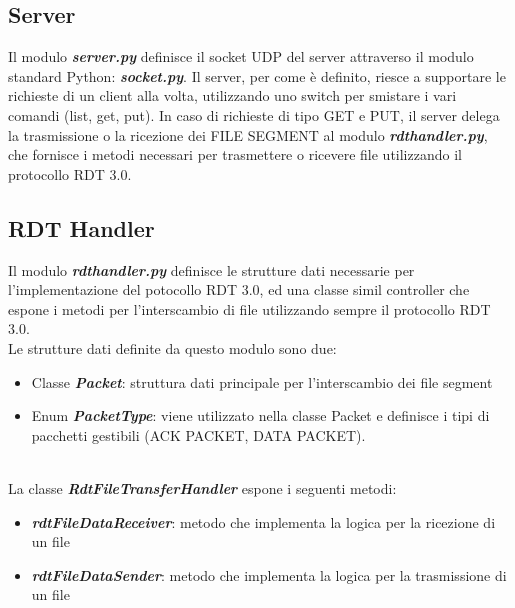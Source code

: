 \documentclass{article}
\begin{document}
\subsection{Server}


Il modulo \textbf{\emph{server.py}} definisce il socket UDP del server attraverso il modulo standard Python: \textbf{\emph{socket.py}}.
Il server, per come è definito, riesce a supportare le richieste di un client alla volta, utilizzando uno switch per smistare i vari comandi (list, get, put).
In caso di richieste di tipo GET e PUT, il server delega la trasmissione o la ricezione dei FILE SEGMENT al modulo \textbf{\emph{rdt\textunderscore handler.py}},
che fornisce i metodi necessari per trasmettere o ricevere file utilizzando il protocollo RDT 3.0.

\subsection{RDT Handler}

Il modulo \textbf{\emph{rdt\textunderscore handler.py}} definisce le strutture dati necessarie per l'implementazione del potocollo RDT 3.0, ed una classe simil controller che espone i metodi per l'interscambio di file utilizzando sempre il protocollo RDT 3.0.\\
Le strutture dati definite da questo modulo sono due: 

	\begin{itemize}
			\item Classe \textbf{\emph{Packet}}: struttura dati principale per l'interscambio dei file segment
			\item Enum \textbf{\emph{PacketType}}: viene utilizzato nella classe Packet e definisce i tipi di pacchetti gestibili (ACK PACKET, DATA PACKET).
		\end{itemize}
	\ \\

La classe \textbf{\emph{RdtFileTransferHandler}} espone i seguenti metodi:

	\begin{itemize}
		\item \textbf{\emph{rdtFileDataReceiver}}: metodo che implementa la logica per la ricezione di un file
		\item \textbf{\emph{rdtFileDataSender}}: metodo che implementa la logica per la trasmissione di un file
	\end{itemize}
\ \\
\end{document}
